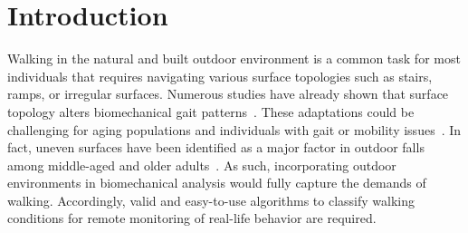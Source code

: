 \documentclass[sensors,article,submit,pdftex,moreauthors]{Definitions/mdpi}
\begin{document}
\section{Introduction}
\label{sec:introduction}

Walking in the natural and built outdoor environment is a common task for most individuals that requires navigating various surface topologies such as stairs, ramps, or irregular surfaces.  
\textcolor{revision2}{Numerous studies have already shown that surface topology alters biomechanical gait patterns~\cite{blair2018magnitude, allet2009gait, ippersiel_impact_2022, Dixon_2018, vieira_gait_2017, menz_acceleration_2003, emmerzaal_non-linear_2025, menant2009effects}}.
These adaptations could be challenging for aging populations and individuals with gait or mobility issues~\cite{allet2009gait, menant2009effects}. In fact, uneven surfaces have been identified as a major factor in outdoor falls among middle-aged and older adults~\cite{li_2006}. %
As such, incorporat\textcolor{revision2}{ing} outdoor environments in biomechanical analysis would fully capture the demands of walking. Accordingly, valid and easy-to-use algorithms to classify walking conditions for remote monitoring of real-life behavior are required.


\end{document}
